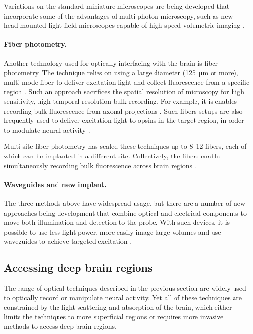 Variations on the standard miniature microscopes are being 
developed that incorporate some of the advantages of multi-photon
microscopy, such as new head-mounted light-field microscopes 
capable of high speed volumetric imaging \cite{Skocek:2018hs}.

\paragraph{Fiber photometry.} Another technology used 
for optically interfacing with the brain is fiber photometry. 
The technique relies on using a large diameter 
(125~\si{\micro\meter} or more), multi-mode fiber to 
deliver excitation light and collect fluorescence from a 
specific region 
\cite{Adelsberger:2005dy,Cui:2013dq,Adelsberger:2014jd}.
Such an approach sacrifices the spatial resolution of 
microscopy for high sensitivity, high temporal resolution 
bulk recording. For example, it is enables recording bulk 
fluorescence from axonal projections \cite{Gunaydin:2014dh}. 
Such fibers setups are also frequently used to deliver 
excitation light to opsins in the target region, in order
to modulate neural activity \cite{Warden:2014bx}.

Multi-site fiber photometry has scaled these techniques up to 
8--12 fibers, each of which can be implanted in a different site.
Collectively, the fibers enable simultaneously recording bulk 
fluorescence across brain regions \cite{Guo:2015gu}.

\paragraph{Waveguides and new implant.} The three methods 
above have widespread usage, but there are a number of new 
approaches being development that combine optical and electrical 
components to move both illumination and detection to the probe.
With such devices, it is possible to use less light power, 
more easily image large volumes and use waveguides to achieve 
targeted excitation \cite{Warden:2014bx,Wu:2015gk,Segev:2017en}.

\subsection{Accessing deep brain regions}

The range of optical techniques described in the previous 
section are widely used to optically record or manipulate 
neural activity. Yet all of these techniques are constrained 
by the light scattering and absorption of the brain, which 
either limits the techniques to more superficial regions or 
requires more invasive methods to access deep brain regions.

